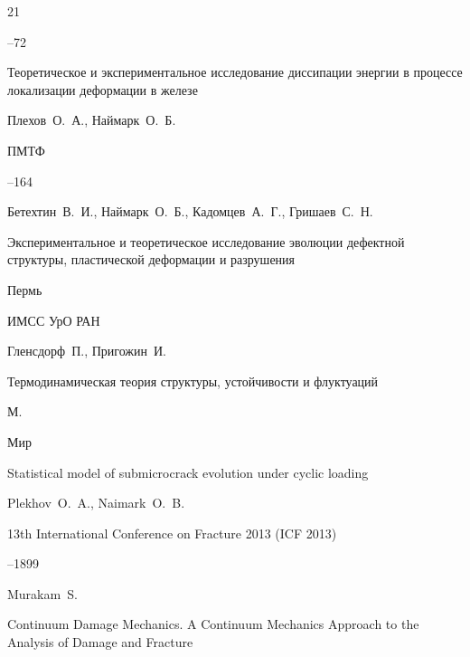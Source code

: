 \begin{thebibliography}{21}

--72




\paper Теоретическое и экспериментальное исследование диссипации энергии в процессе локализации деформации в железе

\by Плехов~О.~А., Наймарк~О.~Б.

\jour ПМТФ



--164




\by Бетехтин~В.~И., Наймарк~О.~Б., Кадомцев~А.~Г., Гришаев~С.~Н.

\book Экспериментальное и теоретическое исследование эволюции дефектной структуры, пластической деформации и разрушения

\publaddr Пермь

\publ ИМСС УрО РАН






\by Гленсдорф~П., Пригожин~И.

\book Термодинамическая теория структуры, устойчивости и флуктуаций

\publaddr М.

\publ Мир






\paper Statistical model of submicrocrack evolution under cyclic loading

\by Plekhov~O.~A., Naimark~O.~B.

\jour 13th International Conference on Fracture 2013 (ICF 2013)


--1899




\by Murakam~S.

\book  Continuum Damage Mechanics. A Continuum Mechanics Approach to the Analysis of Damage and Fracture


\end{thebibliography}
